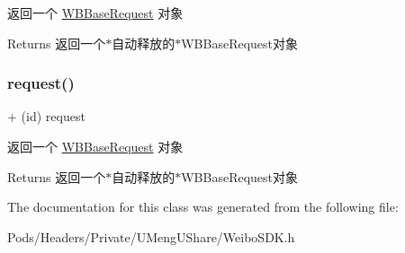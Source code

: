 返回一个 \mbox{\hyperlink{interface_w_b_base_request}{W\+B\+Base\+Request}} 对象

\begin{DoxyReturn}{Returns}
返回一个$\ast$自动释放的$\ast$\+W\+B\+Base\+Request对象 
\end{DoxyReturn}
\mbox{\label{interface_w_b_base_request_ab7489935d2d09eab8dbafff096c5432b}} 
\subsubsection{\texorpdfstring{request()}{request()}\hspace{0.1cm}{\footnotesize\ttfamily [3/3]}}
{\footnotesize\ttfamily + (id) request \begin{DoxyParamCaption}{ }\end{DoxyParamCaption}}

返回一个 \mbox{\hyperlink{interface_w_b_base_request}{W\+B\+Base\+Request}} 对象

\begin{DoxyReturn}{Returns}
返回一个$\ast$自动释放的$\ast$\+W\+B\+Base\+Request对象 
\end{DoxyReturn}


The documentation for this class was generated from the following file\+:\begin{DoxyCompactItemize}
\item 
Pods/\+Headers/\+Private/\+U\+Meng\+U\+Share/Weibo\+S\+D\+K.\+h\end{DoxyCompactItemize}
